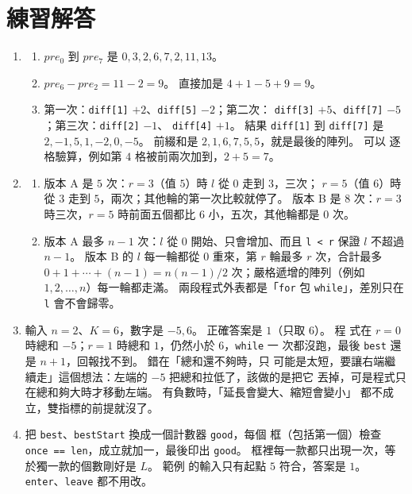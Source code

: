 \section*{練習解答}

\begin{enumerate}
\item
\begin{enumerate}
\item $pre_0$ 到 $pre_7$ 是 $0, 3, 2, 6, 7, 2, 11, 13$。
\item $pre_6 - pre_2 = 11 - 2 = 9$。 直接加是 $4 + 1 - 5 + 9 = 9$。
\item 第一次：\texttt{diff[1]} $+2$、\texttt{diff[5]} $-2$；第二次：
\texttt{diff[3]} $+5$、\texttt{diff[7]} $-5$；第三次：\texttt{diff[2]} $-1$、
\texttt{diff[4]} $+1$。 結果 \texttt{diff[1]} 到 \texttt{diff[7]} 是
$2, -1, 5, 1, -2, 0, -5$。 前綴和是 $2, 1, 6, 7, 5, 5$，就是最後的陣列。 可以
逐格驗算，例如第 $4$ 格被前兩次加到，$2 + 5 = 7$。
\end{enumerate}

\item
\begin{enumerate}
\item 版本 A 是 $5$ 次：$r = 3$（值 $5$）時 $l$ 從 $0$ 走到 $3$，三次；
$r = 5$（值 $6$）時從 $3$ 走到 $5$，兩次；其他輪的第一次比較就停了。 版本 B
是 $8$ 次：$r = 3$ 時三次，$r = 5$ 時前面五個都比 $6$ 小，五次，其他輪都是
$0$ 次。
\item 版本 A 最多 $n - 1$ 次：$l$ 從 $0$ 開始、只會增加、而且 \texttt{l < r}
保證 $l$ 不超過 $n - 1$。 版本 B 的 $l$ 每一輪都從 $0$ 重來，第 $r$ 輪最多 $r$
次，合計最多 $0 + 1 + \cdots + (n - 1) = n(n - 1)/2$ 次；嚴格遞增的陣列（例如
$1, 2, \ldots, n$）每一輪都走滿。 兩段程式外表都是「\texttt{for} 包
\texttt{while}」，差別只在 \texttt{l} 會不會歸零。
\end{enumerate}

\item 輸入 $n = 2$、$K = 6$，數字是 $-5, 6$。 正確答案是 $1$（只取 $6$）。 程
式在 $r = 0$ 時總和 $-5$；$r = 1$ 時總和 $1$，仍然小於 $6$，\texttt{while} 一
次都沒跑，最後 \texttt{best} 還是 $n + 1$，回報找不到。 錯在「總和還不夠時，只
可能是太短，要讓右端繼續走」這個想法：左端的 $-5$ 把總和拉低了，該做的是把它
丟掉，可是程式只在總和夠大時才移動左端。 有負數時，「延長會變大、縮短會變小」
都不成立，雙指標的前提就沒了。

\item 把 \texttt{best}、\texttt{bestStart} 換成一個計數器 \texttt{good}，每個
框（包括第一個）檢查 \texttt{once == len}，成立就加一，最後印出
\texttt{good}。 框裡每一款都只出現一次，等於獨一款的個數剛好是 $L$。 範例
的輸入只有起點 $5$ 符合，答案是 $1$。 \texttt{enter}、\texttt{leave} 都不用改。


\end{enumerate}
